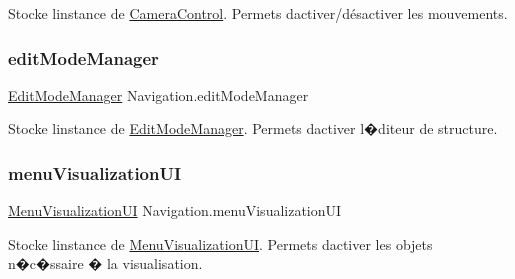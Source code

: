 Stocke l\textquotesingle{}instance de \mbox{\hyperlink{class_camera_control}{Camera\+Control}}. Permets d\textquotesingle{}activer/désactiver les mouvements. 

\mbox{\label{class_navigation_a59344933bd9a22b16612407dee4e8aa5}} 
\subsubsection{\texorpdfstring{edit\+Mode\+Manager}{editModeManager}}
{\footnotesize\ttfamily \mbox{\hyperlink{class_edit_mode_manager}{Edit\+Mode\+Manager}} Navigation.\+edit\+Mode\+Manager}



Stocke l\textquotesingle{}instance de \mbox{\hyperlink{class_edit_mode_manager}{Edit\+Mode\+Manager}}. Permets d\textquotesingle{}activer l\textquotesingle{}�diteur de structure. 

\mbox{\label{class_navigation_affdf26928cacf9c7582cb21ff6bf85dd}} 
\subsubsection{\texorpdfstring{menu\+Visualization\+UI}{menuVisualizationUI}}
{\footnotesize\ttfamily \mbox{\hyperlink{class_menu_visualization_u_i}{Menu\+Visualization\+UI}} Navigation.\+menu\+Visualization\+UI}



Stocke l\textquotesingle{}instance de \mbox{\hyperlink{class_menu_visualization_u_i}{Menu\+Visualization\+UI}}. Permets d\textquotesingle{}activer les objets n�c�ssaire � la visualisation. 

